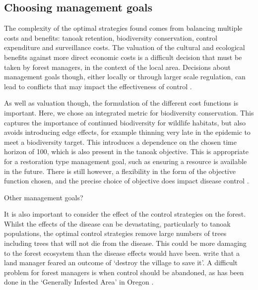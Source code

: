 \citep{maccleery_reinventing_2015, cobb_resiliency_2017, cobb_biodiversity_2013, ndeffo_mbah_balancing_2010, ndeffo_mbah_optimization_2010}

\subsection{Choosing management goals}

The complexity of the optimal strategies found comes from balancing multiple costs and benefits: tanoak retention, biodiversity conservation, control expenditure and surveillance costs. The valuation of the cultural and ecological benefits against more direct economic costs is a difficult decision that must be taken by forest managers, in the context of the local area. Decisions about management goals though, either locally or through larger scale regulation, can lead to conflicts that may impact the effectiveness of control \citep{alexander_lessons_2010}.

As well as valuation though, the formulation of the different cost functions is important. Here, we chose an integrated metric for biodiversity conservation. This captures the importance of continued biodiversity for wildlife habitats, but also avoids introducing edge effects, for example thinning very late in the epidemic to meet a biodiversity target. This introduces a dependence on the chosen time horizon of \SI{100}{\years}, which is also present in the tanoak objective. This is appropriate for a restoration type management goal, such as ensuring a resource is available in the future. There is still however, a flexibility in the form of the objective function chosen, and the precise choice of objective does impact disease control \citep{probert_decision_2016}.

Other management goals? \citep{cobb_resiliency_2017}

It is also important to consider the effect of the control strategies on the forest. Whilst the effects of the disease can be devastating, particularly to tanoak populations, the optimal control strategies remove large numbers of trees including trees that will not die from the disease. This could be more damaging to the forest ecosystem than the disease effects would have been. \citet{alexander_lessons_2010} write that a land manager feared an outcome of `destroy the village to save it'. A difficult problem for forest managers is when control should be abandoned, as has been done in the `Generally Infested Area' in Oregon \citep{hansen_efficacy_2019}.

